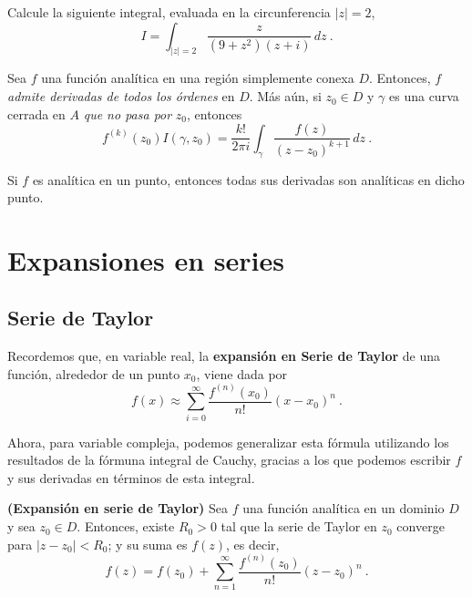 \begin{ejemplo}
    Calcule la siguiente integral, evaluada en la circunferencia $|z| = 2$,
    \begin{equation*}
        I = \int_{|z|=2} \frac{z}{(9+z^2)(z+i)} \, dz \ .
    \end{equation*}
\end{ejemplo}

\begin{teorema}
    Sea $f$ una función analítica en una región simplemente conexa $D$. Entonces, $f$ \emph{admite derivadas de todos los órdenes} en $D$. Más aún, si $z_0 \in D$ y $\gamma$ es una curva cerrada en $A$ \emph{que no pasa por} $z_0$, entonces 
    \begin{equation}
        f^{(k)}(z_0) I(\gamma, z_0) = \frac{k!}{2\pi i} \int_\gamma \frac{f(z)}{(z-z_0)^{k+1}} \, dz \ .
    \end{equation}
\end{teorema}

\begin{corolario}
    Si $f$ es analítica en un punto, entonces todas sus derivadas son analíticas en dicho punto.
\end{corolario}

\section{Expansiones en series}

\subsection{Serie de Taylor}

Recordemos que, en variable real, la \textbf{expansión en Serie de Taylor} de una función, alrededor de un punto $x_0$, viene dada por 
\begin{equation}
    f(x) \approx \sum_{i=0}^\infty \frac{f^{(n)}(x_0)}{n!} (x-x_0)^n \ .
\end{equation}

Ahora, para variable compleja, podemos generalizar esta fórmula utilizando los resultados de la fórmuna integral de Cauchy, gracias a los que podemos escribir $f$ y sus derivadas en términos de esta integral.

\begin{teorema}{\textbf{(Expansión en serie de Taylor)}}
    Sea $f$ una función analítica en un dominio $D$ y sea $z_0 \in D$. Entonces, existe $R_0 > 0$ tal que la serie de Taylor en $z_0$ converge para $|z-z_0| < R_0$; y su suma es $f(z)$, es decir,
    \begin{equation}
        f(z) = f(z_0) + \sum_{n=1}^\infty \frac{f^{(n)}(z_0)}{n!} (z-z_0)^n \ .
    \end{equation}
\end{teorema}

